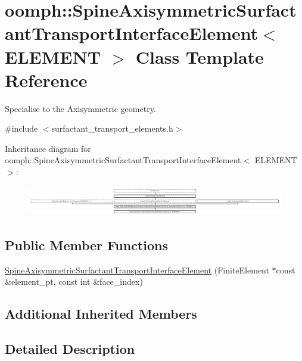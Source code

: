 \hypertarget{classoomph_1_1SpineAxisymmetricSurfactantTransportInterfaceElement}{}\section{oomph\+:\+:Spine\+Axisymmetric\+Surfactant\+Transport\+Interface\+Element$<$ E\+L\+E\+M\+E\+NT $>$ Class Template Reference}
\label{classoomph_1_1SpineAxisymmetricSurfactantTransportInterfaceElement}


Specialise to the Axisymmetric geometry.  




{\ttfamily \#include $<$surfactant\+\_\+transport\+\_\+elements.\+h$>$}

Inheritance diagram for oomph\+:\+:Spine\+Axisymmetric\+Surfactant\+Transport\+Interface\+Element$<$ E\+L\+E\+M\+E\+NT $>$\+:\begin{figure}[H]
\begin{center}
\leavevmode
\includegraphics[height=1.333333cm]{classoomph_1_1SpineAxisymmetricSurfactantTransportInterfaceElement}
\end{center}
\end{figure}
\subsection*{Public Member Functions}
\begin{DoxyCompactItemize}
\item 
\hyperlink{classoomph_1_1SpineAxisymmetricSurfactantTransportInterfaceElement_a60ac6b568dc388e584d423d4b4e9438a}{Spine\+Axisymmetric\+Surfactant\+Transport\+Interface\+Element} (Finite\+Element $\ast$const \&element\+\_\+pt, const int \&face\+\_\+index)
\end{DoxyCompactItemize}
\subsection*{Additional Inherited Members}


\subsection{Detailed Description}
